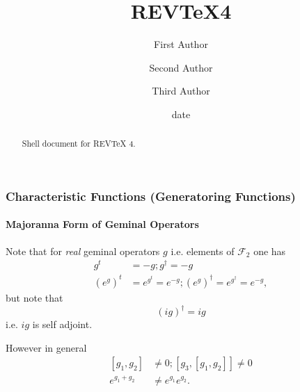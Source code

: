 \documentclass[aps,preprint]{revtex4}%
\begin{document}
\title[Short title for running header]{REV\TeX4}
\author{First Author}
\author{Second Author}
\author{Third Author}

\begin{abstract}
Shell document for REV\TeX{} 4.

\end{abstract}
\date[Date text]{date}




\maketitle
\tableofcontents


\subsubsection{Characteristic Functions (Generatoring Functions)}

\paragraph{Majoranna Form of Geminal Operators}

Note that for \emph{real} geminal operators $g$ i.e. elements of
$\mathcal{F}_{2}$ one has
\begin{align}
g^{t} &  =-g;g^{\dagger}=-g\\
\left(  e^{g}\right)  ^{t} &  =e^{g^{t}}=e^{-g};\left(  e^{g}\right)
^{\dagger}=e^{g^{\dagger}}=e^{-g},
\end{align}
but note that
\begin{equation}
\left(  ig\right)  ^{\dagger}=ig
\end{equation}
i.e. $ig$ is self adjoint.

However in general%
\begin{align}
\left[  g_{1},g_{2}\right]    & \neq0;\left[  g_{3},\left[  g_{1}%
,g_{2}\right]  \right]  \neq0\\
e^{g_{1}+g_{2}}  & \neq e^{g_{1}}e^{g_{2}}.
\end{align}
\end{document}
